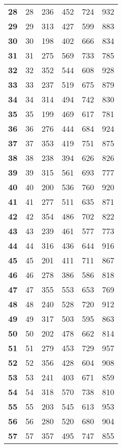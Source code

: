 \begin{longtable}{|l|c|c|c|c|c|}
    \textbf{28} & 28 &236 & 452 & 724 & 932 \\
    \textbf{29} & 29 &313 & 427 & 599 & 883 \\
    \textbf{30} & 30 &198 & 402 & 666 & 834 \\
    \textbf{31} & 31 &275 & 569 & 733 & 785 \\
    \textbf{32} & 32 &352 & 544 & 608 & 928 \\
    \textbf{33} & 33 &237 & 519 & 675 & 879 \\
    \textbf{34} & 34 &314 & 494 & 742 & 830 \\
    \textbf{35} & 35 &199 & 469 & 617 & 781 \\
    \textbf{36} & 36 &276 & 444 & 684 & 924 \\
    \textbf{37} & 37 &353 & 419 & 751 & 875 \\
    \textbf{38} & 38 &238 & 394 & 626 & 826 \\
    \textbf{39} & 39 &315 & 561 & 693 & 777 \\
    \textbf{40} & 40 &200 & 536 & 760 & 920 \\
    \textbf{41} & 41 &277 & 511 & 635 & 871 \\
    \textbf{42} & 42 &354 & 486 & 702 & 822 \\
    \textbf{43} & 43 &239 & 461 & 577 & 773 \\
    \textbf{44} & 44 &316 & 436 & 644 & 916 \\
    \textbf{45} & 45 &201 & 411 & 711 & 867 \\
    \textbf{46} & 46 &278 & 386 & 586 & 818 \\
    \textbf{47} & 47 &355 & 553 & 653 & 769 \\
    \textbf{48} & 48 &240 & 528 & 720 & 912 \\
    \textbf{49} & 49 &317 & 503 & 595 & 863 \\
    \textbf{50} & 50 &202 & 478 & 662 & 814 \\
    \textbf{51} & 51 &279 & 453 & 729 & 957 \\
    \textbf{52} & 52 &356 & 428 & 604 & 908 \\
    \textbf{53} & 53 &241 & 403 & 671 & 859 \\
    \textbf{54} & 54 &318 & 570 & 738 & 810 \\
    \textbf{55} & 55 &203 & 545 & 613 & 953 \\
    \textbf{56} & 56 &280 & 520 & 680 & 904 \\
    \textbf{57} & 57 &357 & 495 & 747 & 855 \\

\end{longtable}
